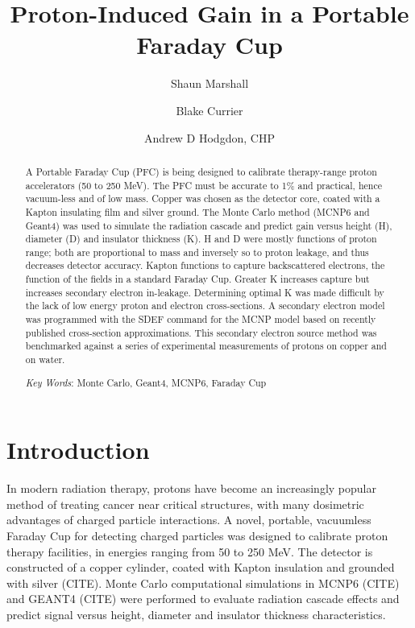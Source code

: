 \documentclass{mc2015}
\begin{document}
\title{Proton-Induced Gain in a Portable Faraday Cup}

\author{Shaun Marshall}
\author{Blake Currier}

\author{Andrew D Hodgdon, CHP}

\maketitle

\begin{abstract}
A Portable Faraday Cup (PFC) is being designed to calibrate therapy-range proton accelerators (50 to 250 MeV).  The PFC must be accurate to 1\% and practical, hence vacuum-less and of low mass.  Copper was chosen as the detector core, coated with a Kapton insulating film and silver ground.  The Monte Carlo method (MCNP6 and Geant4) was used to simulate the radiation cascade and predict gain versus height (H), diameter (D) and insulator thickness (K). H and D were mostly functions of proton range; both are proportional to mass and inversely so to proton leakage, and thus decreases detector accuracy. Kapton functions to capture backscattered electrons, the function of the fields in a standard Faraday Cup. Greater K increases capture but increases secondary electron in-leakage. Determining optimal K was made difficult by the lack of low energy proton and electron cross-sections. A secondary electron model was programmed with the SDEF command for the MCNP model based on recently published cross-section approximations. This secondary electron source method was benchmarked against a series of experimental measurements of protons on copper and on water.

\emph{Key Words}: Monte Carlo, Geant4, MCNP6, Faraday Cup
\end{abstract}


\section{Introduction}

In modern radiation therapy, protons have become an increasingly popular method of treating cancer near critical structures, with many dosimetric advantages of charged particle interactions\cite{ne05}\cite{ryckman}. A novel, portable, vacuumless Faraday Cup for detecting charged particles was designed to calibrate proton therapy facilities, in energies ranging from 50 to 250 MeV. The detector is constructed of a copper cylinder, coated with Kapton insulation and grounded with silver (CITE). Monte Carlo computational simulations in MCNP6 (CITE) and GEANT4 (CITE) were performed to evaluate radiation cascade effects and predict signal versus height, diameter and insulator thickness characteristics.
\end{document}
